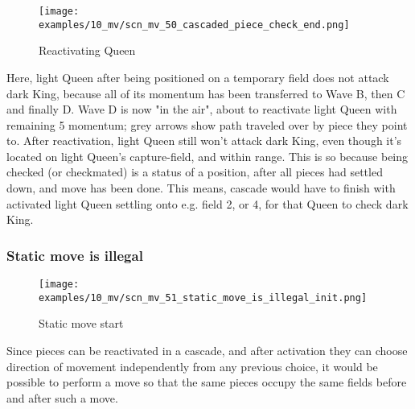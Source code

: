 \vspace*{-2.3\baselineskip}
\noindent
\begin{figure}[!h]
\texttt{[image: examples/10\_mv/scn\_mv\_50\_cascaded\_piece\_check\_end.png]}
\vspace*{-1.3\baselineskip}
\caption{Reactivating Queen}
\label{fig:scn_mv_50_cascaded_piece_check_end}
\end{figure}

\vspace*{-0.3\baselineskip}
Here, light Queen after being positioned on a temporary field does not attack dark
King, because all of its momentum has been transferred to Wave B, then C and finally
D. Wave D is now "in the air", about to reactivate light Queen with remaining 5
momentum; grey arrows show path traveled over by piece they point to. After
reactivation, light Queen still won't attack dark King, even though it's located on
light Queen's capture-field, and within range. This is so because being checked (or
checkmated) is a status of a position, after all pieces had settled down, and move
has been done. This means, cascade would have to finish with activated light Queen
settling onto e.g. field 2, or 4, for that Queen to check dark King.

\clearpage %

\subsubsection*{Static move is illegal}
\label{sec:Miranda's veil/Wave/Cascading Waves/Static move is illegal}

\vspace*{-1.4\baselineskip}
\noindent
\begin{figure}[!h]
\texttt{[image: examples/10\_mv/scn\_mv\_51\_static\_move\_is\_illegal\_init.png]}
\vspace*{-1.3\baselineskip}
\caption{Static move start}
\label{fig:scn_mv_51_static_move_is_illegal_init}
\end{figure}

\vspace*{-0.4\baselineskip}
Since pieces can be reactivated in a cascade, and after activation they can choose
direction of movement independently from any previous choice, it would be possible
to perform a move so that the same pieces occupy the same fields before and after
such a move.

